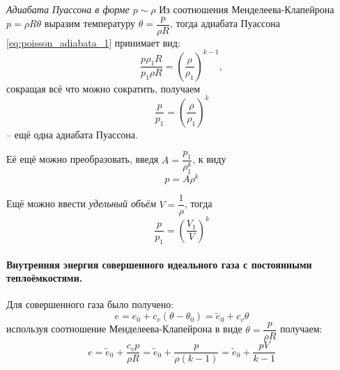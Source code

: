 \textit{Адиабата Пуассона в форме $p \sim \rho$}
Из соотношения Менделеева-Клапейрона $p = \rho R \theta$ выразим температуру $\theta = \dfrac{p}{\rho R}$, тогда адиабата Пуассона \eqref{eq:poisson_adiabata_1} принимает вид:
\[
  \dfrac{p \rho_1 R}{p_1 \rho R} = \left(\dfrac{\rho}{\rho_1} \right)^{k-1},
\]
сокращая всё что можно сократить, получаем
\begin{equation}\label{eq:poisson_adiabata_2}
  \dfrac{p}{p_1} = \left( \dfrac{\rho}{\rho_1} \right)^{k}
\end{equation}
-- ещё одна адиабата Пуассона.

Её ещё можно преобразовать, введя $A = \dfrac{p_1}{\rho_1^k}$, к виду
\begin{equation}\label{eq:poisson_adiabata_3}
  p = A \rho^k
\end{equation}

Ещё можно ввести \emph{удельный объём} $V = \dfrac{1}{\rho}$, тогда
\begin{equation}\label{eq:poisson_adiabata_2}
  \dfrac{p}{p_1} = \left( \dfrac{V_1}{V} \right)^{k}
\end{equation}

\paragraph{Внутренняя энергия совершенного идеального газа с постоянными теплоёмкостями.}
Для совершенного газа было получено:
\[
  e = e_0 + c_v(\theta - \theta_0) = \tilde e_0 + c_v \theta
\]
используя соотношение Менделеева-Клапейрона в виде $\theta = \dfrac{p}{\rho R}$ получаем:
\[
  e = \tilde e_0 + \dfrac{c_v p}{\rho R} = \tilde e_0 + \dfrac{p}{\rho (k-1)} =
  \tilde e_0 + \dfrac{pV}{k-1}
\]
